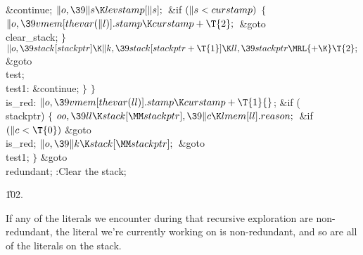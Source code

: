 \&{continue};\2\6
${}\|o,\39\|s\K\\{levstamp}[\|s];{}$\6
\&{if} ${}(\|s<\\{curstamp}){}$\5
${}\{{}$\1\6
${}\|o,\39\\{vmem}[\\{thevar}(\|l)].\\{stamp}\K\\{curstamp}+\T{2};{}$\6
\&{goto} \\{clear\_stack};\6
\4${}\}{}$\2\6
${}\|o,\39\\{stack}[\\{stackptr}]\K\|k,\39\\{stack}[\\{stackptr}+\T{1}]\K%
\\{ll},\39\\{stackptr}\MRL{+{\K}}\T{2};{}$\6
\&{goto} \\{test};\6
\4\\{test1}:\5
\&{continue};\6
\4${}\}{}$\2\6
\4${}\}{}$\2\6
\4\\{is\_red}:\5
${}\|o,\39\\{vmem}[\\{thevar}(\\{ll})].\\{stamp}\K\\{curstamp}+\T{1}{}$;\6
\&{if} (\\{stackptr})\5
${}\{{}$\1\6
${}\\{oo},\39\\{ll}\K\\{stack}[\MM\\{stackptr}],\39\|c\K\\{lmem}[\\{ll}].%
\\{reason};{}$\6
\&{if} ${}(\|c<\T{0}){}$\1\5
\&{goto} \\{is\_red};\2\6
${}\|o,\39\|k\K\\{stack}[\MM\\{stackptr}];{}$\6
\&{goto} \\{test1};\6
\4${}\}{}$\2\6
\&{goto} \\{redundant};\6
:Clear the stack\X;\par
\U102.\fi

If any of the literals we encounter during that recursive
exploration
are non-redundant, the literal  we're currently working on is
non-redundant, and so are all of the literals on the stack.

